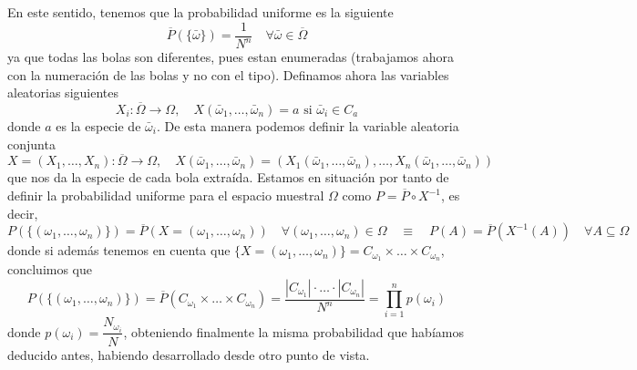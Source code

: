 \noindent
En este sentido, tenemos que la probabilidad uniforme es la siguiente
\begin{equation*}
    \overline{P}(\{\bar{\omega}\})=\dfrac{1}{N^n} \quad  \forall \bar{\omega}\in \overline{\Omega}
\end{equation*}
ya que todas las bolas son diferentes, pues estan enumeradas (trabajamos ahora con la numeración de las bolas y no con el tipo). Definamos ahora las variables aleatorias siguientes
\begin{equation*}
    X_i:\overline{\Omega} \to \Omega, \quad X(\bar{\omega}_1, \ldots, \bar{\omega}_n) = a \text{ si } \bar{\omega}_i \in C_a
\end{equation*}
donde $a$ es la especie de $\bar{\omega}_i$. De esta manera podemos definir la variable aleatoria conjunta
\begin{equation*}
    X=(X_1, \dots, X_n):\overline{\Omega} \to \Omega, \quad X(\bar{\omega}_1, \ldots, \bar{\omega}_n) = (X_1(\bar{\omega}_1, \ldots, \bar{\omega}_n), \ldots, X_n(\bar{\omega}_1, \ldots, \bar{\omega}_n))
\end{equation*}
que nos da la especie de cada bola extraída. Estamos en situación por tanto de definir la probabilidad uniforme para el espacio muestral $\Omega$ como $P=\overline{P} \circ X^{-1}$, es decir,
\begin{equation*}
    P(\{(\omega_1, \ldots, \omega_n)\}) = \overline{P}(X=(\omega_1, \ldots, \omega_n)) \quad \forall (\omega_1, \ldots, \omega_n)\in \Omega \quad \equiv \quad P(A) = \overline{P}(X^{-1}(A)) \quad \forall A\subseteq \Omega
\end{equation*}
donde si además tenemos en cuenta que $\{X=(\omega_1, \ldots, \omega_n)\} = C_{\omega_1} \times \ldots \times C_{\omega_n}$, concluimos que
\begin{equation*}
    P(\{(\omega_1, \ldots, \omega_n)\}) = \overline{P}(C_{\omega_1} \times \ldots \times C_{\omega_n}) = \dfrac{|C_{\omega_1}| \cdot \ldots \cdot |C_{\omega_n}|}{N^n} = \prod_{i=1}^n p(\omega_i)
\end{equation*}
donde $p(\omega_i)=\dfrac{N_{\omega_i}}{N}$, obteniendo finalmente la misma probabilidad que habíamos deducido antes, habiendo desarrollado desde otro punto de vista. \\

